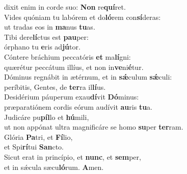 \evenverse dixit enim in corde suo: \textbf{Non} re\textbf{quí}ret.\\
\oddverse Vides quóniam tu labórem et do\textbf{ló}rem con\textbf{sí}deras:~\*\\
\oddverse ut tradas eos in \textbf{ma}nus \textbf{tu}as.\\
\evenverse Tibi dere\textbf{lí}ctus est \textbf{pau}per:~\*\\
\evenverse órphano tu \textbf{e}ris ad\textbf{jú}tor.\\
\oddverse Cóntere bráchium peccatóris \textbf{et} ma\textbf{lí}gni:~\*\\
\oddverse quærétur peccátum illíus, et non in\textbf{ve}ni\textbf{é}tur.\\
\evenverse Dóminus regnábit in ætérnum, et in \textbf{sǽ}culum \textbf{sǽ}culi:~\*\\
\evenverse períbitis, Gentes, de \textbf{ter}ra il\textbf{lí}us.\\
\oddverse Desidérium páuperum exau\textbf{dí}vit \textbf{Dó}minus:~\*\\
\oddverse præparatiónem cordis eórum audívit \textbf{au}ris \textbf{tu}a.\\
\evenverse Judicáre pu\textbf{píl}lo et \textbf{hú}mili,~\*\\
\evenverse ut non appónat ultra magnificáre se homo \textbf{su}per \textbf{ter}ram.\\
\oddverse Glória \textbf{Pa}tri, et \textbf{Fí}lio,~\*\\
\oddverse et Spi\textbf{rí}tui \textbf{San}cto.\\
\evenverse Sicut erat in princípio, et \textbf{nunc}, et \textbf{sem}per,~\*\\
\evenverse et in sǽcula sæcu\textbf{ló}rum. \textbf{A}men.\\
